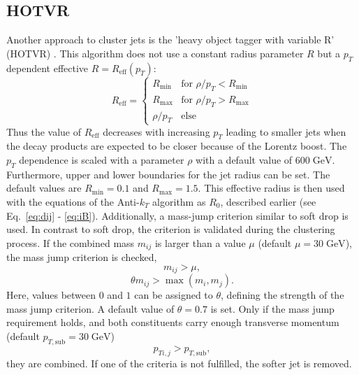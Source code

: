 \subsection{HOTVR}
\label{sec:HOTVR}
	Another approach to cluster jets is the 'heavy object tagger with variable R' (HOTVR) \cite{hotvr}. This algorithm does not use a constant radius parameter $R$ but a $p_T$ dependent effective $R=R_\text{eff}(p_T)$:
	\begin{equation}
	\label{eq:HOTVR}
	  R_\text{eff} =
	   \begin{cases}
	     R_\text{min} & \text{for } \rho / p_T < R_\text{min} \\
	     R_\text{max} & \text{for } \rho / p_T > R_\text{max} \\
	     \rho / p_T & \text{else}  
	   \end{cases}
	\end{equation}
	 Thus the value of $R_\text{eff}$ decreases with increasing $p_T$ leading to smaller jets when the decay products are expected to be closer because of the Lorentz boost. The $p_T$ dependence is scaled with a parameter $\rho$ with a default value of $600\;\text{GeV}$. Furthermore, upper and lower boundaries for the jet radius can be set. The default values are $R_\text{min} = 0.1$ and $R_\text{max} = 1.5$. This effective radius is then used with the equations of the Anti-$k_T$ algorithm as $R_0$, described earlier (see Eq.~\ref{eq:dij} - \ref{eq:iB}). Additionally, a mass-jump criterion similar to soft drop is used. In contrast to soft drop, the criterion is validated during the clustering process. If the combined mass $m_{ij}$ is larger than a value $\mu$ (default $\mu = 30\;\text{GeV}$), the mass jump criterion is checked,
	\begin{equation}
	m_{ij} > \mu,
	\label{eq:hotvr_mij}
	\end{equation}
	\begin{equation}
	\theta m_{ij} > \max(m_i, m_j).
	\label{eq:hotvr_theta}
	\end{equation}
	Here, values between $0$ and $1$ can be assigned to $\theta$, defining the strength of the mass jump criterion. A default value of $\theta =0.7$ is set. Only if the mass jump requirement holds, and both constituents carry enough transverse momentum (default $p_{T,\text{sub}} = 30\;\text{GeV}$)
	\begin{equation}
	p_{Ti,j} > p_{T,\text{sub}},
	\label{eq:hotvr_pt}
	\end{equation}	
	they are combined. If one of the criteria is not fulfilled, the softer jet is removed.
	

